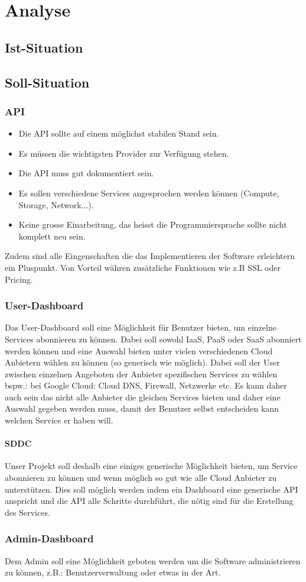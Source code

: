 
\chapter{Analyse}
\section{Ist-Situation}

\section{Soll-Situation}

\subsection{API}
\begin{itemize}
\item Die API sollte auf einem möglichst stabilen Stand sein.
\item Es müssen die wichtigsten Provider zur Verfügung stehen.
\item Die API muss gut dokumentiert sein.
\item Es sollen verschiedene Services angesprochen werden können (Compute, Storage, Network...).
\item Keine grosse Einarbeitung, das heisst die Programmiersprache sollte nicht komplett neu sein.
\end{itemize}

Zudem sind alle Eingenschaften die das Implementieren der Software erleichtern ein 
Pluspunkt. Von Vorteil währen zusätzliche Funktionen wie z.B SSL oder Pricing. 

\subsection{User-Dashboard}
Das User-Dashboard soll eine Möglichkeit für Benutzer bieten, um einzelne Services 
abonnieren zu können.
Dabei soll sowohl IaaS, PaaS oder SaaS abonniert werden können und eine Auswahl 
bieten unter vielen verschiedenen Cloud Anbietern wählen zu können (so generisch wie 
möglich).
Dabei soll der User zwischen einzelnen Angeboten der Anbieter spezifischen 
Services zu wählen bspw.: bei Google Cloud: Cloud DNS, Firewall, Netzwerke etc.
Es kann daher auch sein das nicht alle Anbieter die gleichen Services bieten und 
daher eine Auswahl gegeben werden muss, damit der Benutzer selbst entscheiden 
kann welchen Service er haben will.

\subsubsection{SDDC}
Unser Projekt soll deshalb eine einiges generische Möglichkeit bieten, um 
Service abonnieren zu können und wenn möglich so gut wie alle Cloud Anbieter zu 
unterstützen.
Dies soll möglich werden indem ein Dashboard eine generische API anspricht und 
die API alle Schritte durchführt, die nötig sind für die Erstellung des 
Services.

\subsection{Admin-Dashboard}
Dem Admin soll eine Möglichkeit geboten werden um die Software administrieren zu 
können, z.B.: Benutzerverwaltung oder etwas in der Art.

